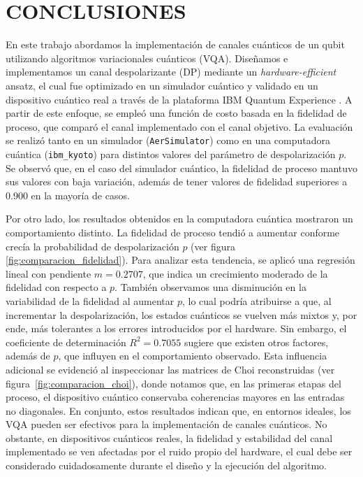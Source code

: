 \documentclass[letterpaper,12pt]{thesisECFM}
\theoremstyle{plain}
\theoremstyle{definition}
\theoremstyle{definition}
\theoremstyle{remark}
\newcommand{\1}{\mathbb{1}}
\begin{document}
\chapter{CONCLUSIONES} %
En este trabajo abordamos la implementación de canales cuánticos de un qubit
utilizando algoritmos variacionales cuánticos (VQA). Diseñamos e implementamos
un canal despolarizante (DP) mediante un \textit{hardware-efficient} ansatz, el
cual fue optimizado en un simulador cuántico y validado en un dispositivo
cuántico real a través de la plataforma IBM Quantum Experience
\cite{VQA,ibm_quantum_resources}. A partir de este enfoque, se empleó una
función de costo basada en la fidelidad de proceso, que comparó el canal
implementado con el canal objetivo. La evaluación se realizó tanto en un
simulador (\texttt{AerSimulator}) como en una computadora cuántica
(\texttt{ibm\_kyoto}) para distintos valores del parámetro de despolarización
$p$. Se observó que, en el caso del simulador cuántico, la fidelidad de proceso
mantuvo sus valores con baja variación, además de tener valores de fidelidad
superiores a 0.900 en la mayoría de casos. 

Por otro lado, los resultados obtenidos en la computadora cuántica mostraron un
comportamiento distinto. La fidelidad de proceso tendió a aumentar conforme
crecía la probabilidad de despolarización $p$ (ver figura
\ref{fig:comparacion_fidelidad}). Para analizar esta tendencia, se aplicó una
regresión lineal con pendiente $m = 0.2707$, que indica un crecimiento moderado
de la fidelidad con respecto a $p$. También observamos una disminución en la
variabilidad de la fidelidad al aumentar $p$, lo cual podría atribuirse a que,
al incrementar la despolarización, los estados cuánticos se vuelven más mixtos
y, por ende, más tolerantes a los errores introducidos por el hardware. Sin
embargo, el coeficiente de determinación $R^2 = 0.7055$ sugiere que existen
otros factores, además de $p$, que influyen en el comportamiento observado.
Esta influencia adicional se evidenció al inspeccionar las matrices de Choi
reconstruidas (ver figura~\ref{fig:comparacion_choi}), donde notamos que, en
las primeras etapas del proceso, el dispositivo cuántico conservaba coherencias
mayores en las entradas no diagonales. En conjunto, estos resultados indican
que, en entornos ideales, los VQA pueden ser efectivos para la implementación
de canales cuánticos. No obstante, en dispositivos cuánticos reales, la
fidelidad y estabilidad del canal implementado se ven afectadas por el ruido
propio del hardware, el cual debe ser considerado cuidadosamente durante el
diseño y la ejecución del algoritmo.
\end{document}
